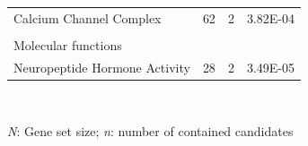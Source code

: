 \begin{refsection}
\begin{table}[H]
\begin{tabular}{@{}llll@{}}
Calcium Channel Complex                             & 62  & 2 & 3.82E-04         \\
                                                    &   &   &   
        \\
Molecular functions                                 &     &   &                  \\
Neuropeptide Hormone Activity                       & 28  & 2 & 3.49E-05         \\ \hline
\end{tabular}\\
{\begin{flushleft}
\scriptsize \textit{N}: Gene set size; \textit{n}: number of contained candidates
\end{flushleft}}
\end{table}



\end{refsection}
